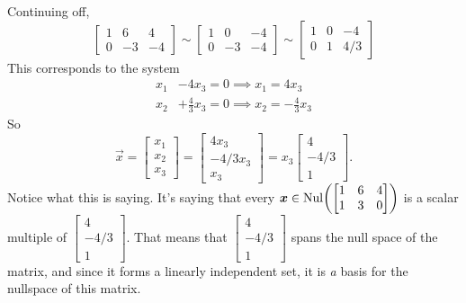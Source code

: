 \begin{enumerate}
			Continuing off, 
			\[\begin{bmatrix}1 & 6 & 4 \\ 0 & -3 & -4\end{bmatrix} \sim \begin{bmatrix}1 & 0 & -4 \\ 0 & -3 & -4\end{bmatrix}
			  \sim \begin{bmatrix}1 & 0 & -4 \\ 0 & 1 & 4/3\end{bmatrix}\]
			This corresponds to the system
			 \begin{align*}
				      x_1 &        - 4x_3       = 0 \implies x_1 = 4x_3 \\
				      x_2 &+\frac{4}{3}x_3 = 0 \implies x_2 = -\frac{4}{3}x_3
			\end{align*}
			So 
			\[\vec{x} = \begin{bmatrix}x_1 \\ x_2 \\ x_3\end{bmatrix} = \begin{bmatrix}4x_3 \\ -4/3x_3 \\ x_3\end{bmatrix} 
				      = x_3\begin{bmatrix}4 \\ -4/3 \\ 1\end{bmatrix}.\]
			Notice what this is saying. It's saying that every \(\bm{x} \in \operatorname{Nul}\biggl(\begin{bmatrix}1 & 6 & 4 \\ 1 & 3 & 0\end{bmatrix}\biggr)\) is a
			scalar multiple of \(\begin{bmatrix}4 \\ -4/3 \\ 1\end{bmatrix}\). That means that \(\begin{bmatrix}4 \\ -4/3 \\ 1\end{bmatrix}\) spans the null
			space of the matrix, and since it forms a linearly independent set, it is \emph{a} basis for the nullspace of this matrix.
	
	\end{enumerate}
